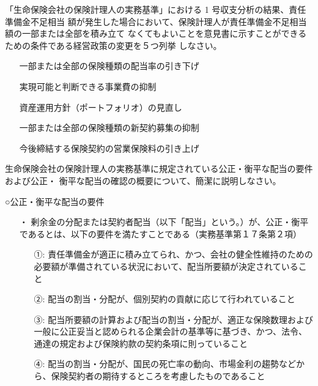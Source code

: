 \documentclass[report,gutter=10mm,fore-edge=10mm,uplatex,dvipdfmx]{jlreq}
\begin{document}

「生命保険会社の保険計理人の実務基準」における 1 号収支分析の結果、責任準備金不足相当
額が発生した場合において、保険計理人が責任準備金不足相当額の一部または全部を積み立て
なくてもよいことを意見書に示すことができるための条件である経営政策の変更を５つ列挙
しなさい。

\answer{}
\begin{itemize}
\item[]  一部または全部の保険種類の配当率の引き下げ
\item[]  実現可能と判断できる事業費の抑制
\item[]  資産運用方針（ポートフォリオ）の見直し
\item[]  一部または全部の保険種類の新契約募集の抑制
\item[]  今後締結する保険契約の営業保険料の引き上げ
\end{itemize}


生命保険会社の保険計理人の実務基準に規定されている公正・衡平な配当の要件および公正・
衡平な配当の確認の概要について、簡潔に説明しなさい。

\answer{}
○公正・衡平な配当の要件

\begin{itemize}
\item[・] 剰余金の分配または契約者配当（以下「配当」という。）が、公正・衡平であるとは、以下の要件を満たすことである（実務基準第１７条第２項）
\begin{itemize}
\item[①: ] 責任準備金が適正に積み立てられ、かつ、会社の健全性維持のための必要額が準備されている状況において、配当所要額が決定されていること
\item[②: ] 配当の割当・分配が、個別契約の貢献に応じて行われていること
\item[③: ] 配当所要額の計算および配当の割当・分配が、適正な保険数理および一般に公正妥当と認められる企業会計の基準等に基づき、かつ、法令、通達の規定および保険約款の契約条項に則っていること
\item[④: ] 配当の割当・分配が、国民の死亡率の動向、市場金利の趨勢などから、保険契約者の期待するところを考慮したものであること
\end{itemize}
\end{itemize}
\end{document}
